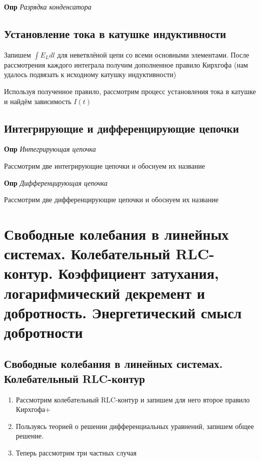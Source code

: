 \documentclass[a4paper, 14pt]{article}
\begin{document}
    \textbf{Опр} \textit{Разрядка конденсатора}
    
    \subsection{Установление тока в катушке индуктивности}
    
    Запишем $\int E_L dl$ для неветвлёной цепи со всеми основными элементами.
    После рассмотрения каждого интеграла получим дополненное правило Кирхгофа (нам удалось подвязать к исходному
    катушку индуктивности)
    
    Используя полученное правило, рассмотрим процесс установления тока в катушке и найдём зависимость $I(t)$
    
    \subsection{Интегрирующие и дифференцирующие цепочки}
    
    \textbf{Опр} \textit{Интегрирующая цепочка}
    
    Рассмотрим две интегрирующие цепочки и обоснуем их название
    
    \textbf{Опр} \textit{Дифференцирующая цепочка}
    
    Рассмотрим две дифференцирующие цепочки и обоснуем их название
    
    \section{Свободные колебания в линейных системах. Колебательный RLC-контур.
    Коэффициент затухания, логарифмический декремент и добротность.
    Энергетический смысл добротности}
    
    \subsection{Свободные колебания в линейных системах. Колебательный RLC-контур}
    
    \begin{enumerate}
        \item Рассмотрим колебательный RLC-контур и запишем для него второе правило Кирхгофа+
        \item Пользуясь теорией о решении дифференциальных уравнений, запишем общее решение.
        \item Теперь рассмотрим три частных случая
    \end{enumerate}
    
\end{document}
